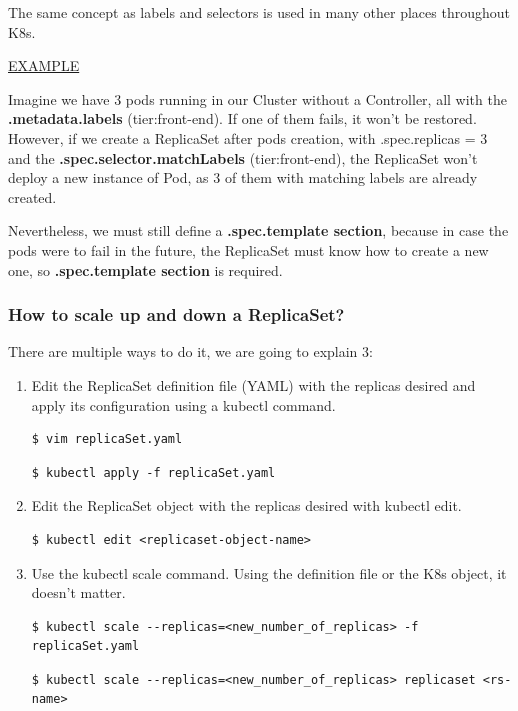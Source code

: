 \documentclass{article}
\newenvironment{codetemplate}[1][]{%
  \mybasecolorbox[#1]
  \itshape
}{%
  \endmybasecolorbox
}
\begin{document}
The same concept as labels and selectors is used in many other places throughout K8s.

\underline{EXAMPLE}

Imagine we have 3 pods running in our Cluster without a Controller, all with the \textbf{.metadata.labels} (tier:front-end). If one of them fails, it won't be restored. However, if we create a ReplicaSet after pods creation, with .spec.replicas = 3 and the \textbf{.spec.selector.matchLabels}  (tier:front-end), the ReplicaSet won't deploy a new instance of Pod, as 3 of them with matching labels are already created.

Nevertheless, we must still define a \textbf{.spec.template section}, because in case the pods were to fail in the future, the ReplicaSet must know how to create a new one, so \textbf{.spec.template section} is required.

\subsubsection{How to scale up and down a ReplicaSet?}

There are multiple ways to do it, we are going to explain 3:

\begin{enumerate}
    \item Edit the ReplicaSet definition file (YAML) with the replicas desired and apply its configuration using a kubectl command.
\begin{codetemplate}{}
\begin{verbatim}
$ vim replicaSet.yaml
\end{verbatim}
\end{codetemplate}
\begin{codetemplate}{}
\begin{verbatim}
$ kubectl apply -f replicaSet.yaml
\end{verbatim}
\end{codetemplate}

    \item Edit the ReplicaSet object with the replicas desired with kubectl edit.
\begin{codetemplate}{}
\begin{verbatim}
$ kubectl edit <replicaset-object-name>
\end{verbatim}
\end{codetemplate}

    \item Use the kubectl scale command. Using the definition file or the K8s object, it doesn't matter.
\begin{codetemplate}{}
\begin{verbatim}
$ kubectl scale --replicas=<new_number_of_replicas> -f replicaSet.yaml
\end{verbatim}
\end{codetemplate}

\begin{codetemplate}{}
\begin{verbatim}
$ kubectl scale --replicas=<new_number_of_replicas> replicaset <rs-name>
\end{verbatim}
\end{codetemplate}
\end{enumerate}
\end{document}
